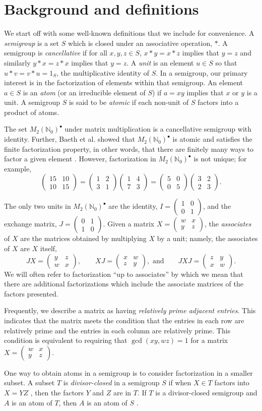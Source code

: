 \documentclass{amsart}
\newcommand{\pmx}[4]{\begin{pmatrix} #1 & #2 \\ #3 & #4 \end{pmatrix}}
\newcommand{\mtwo}{M_2(\mathbb{N}_0)^\bullet}
\begin{document}
\section{Background and definitions}\label{sect: background}

We start off with some well-known definitions that we include for convenience. A {\it semigroup} is a set $S$ which is closed under an associative operation, $*$. A semigroup is {\it cancellative} if for all $x, y, z \in S$, $x*y=x*z$ implies that $y=z$ and similarly $y*x=z*x$ implies that $y=z$. A {\it unit} is an element $u\in S$ so that $u*v=v*u=1_S$, the multiplicative identity of $S$. In a semigroup, our primary interest is in the factorization of elements within that semigroup. An  element $a\in S$ is an {\it atom} (or an irreducible element of $S$) if $a=xy$ implies that $x$ or $y$ is a unit. A semigroup $S$ is said to be {\it atomic} if each non-unit of $S$ factors into a product of atoms.

The set $\mtwo$ under matrix multiplication is a cancellative semigroup with identity. Further, Baeth et al. showed that $\mtwo$ is atomic and satisfies the finite factorization property, in other words, that there are finitely many ways to factor a given element  \cite[Theorem 5.1]{Baeth21}. However, factorization in $\mtwo$ is not unique; for example,
\begin{equation}\label{eq1factor}
\pmx{15}{10}{10}{15}=\pmx{1}{2}{3}{1}\pmx{1}{4}{7}{3}= \pmx{5}{0}{0}{5} \pmx{3}{2}{2}{3}.
\end{equation}


The only two units in $\mtwo$ are the identity, $I=\pmx1001$, and the exchange matrix, $J=\pmx0110$. Given a matrix $X=\pmx{w}{x}{y}{z}$, the \textit{associates} of $X$ are the matrices obtained by multiplying $X$ by a unit; namely, the associates of $X$ are $X$ itself, 
$$JX=\pmx{y}{z}{w}{x}, \qquad XJ=\pmx{x}{w}{z}{y},\text{ and}\qquad JXJ=\pmx{z}{y}{x}{w}.$$
We will often refer to factorization ``up to associates'' by which we mean that there are additional factorizations which include the associate matrices of the factors presented.

Frequently, we describe a matrix as having \textit{relatively prime adjacent entries}. This indicates that the matrix meets the condition that the entries in each row are relatively prime and the entries in each column are relatively prime. This condition is equivalent to requiring that $\gcd(xy, wz)=1$ for a matrix $X=\pmx{w}{x}{y}{z}$.

One way to obtain atoms in a semigroup is to consider factorization in a smaller subset. A subset $T$ is {\it divisor-closed } in a semigroup $S$ if when $X\in T$ factors into $X=YZ$ , then the factors $Y$ and $Z$ are in $T$. If $T$ is a divisor-closed semigroup and $A$ is an atom of $T$, then $A$ is an atom of $S$ \cite[Prop. 3.2]{Baeth21}. 
\end{document}
